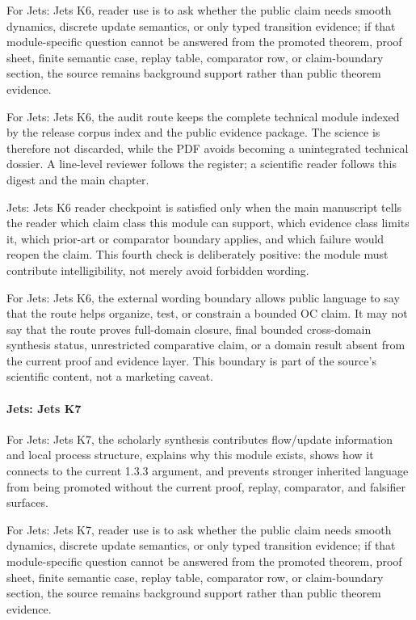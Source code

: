 For Jets: Jets K6, reader use is to ask whether the public claim needs smooth dynamics, discrete update semantics, or only typed transition evidence; if that module-specific question cannot be answered from the promoted theorem, proof sheet, finite semantic case, replay table, comparator row, or claim-boundary section, the source remains background support rather than public theorem evidence.


For Jets: Jets K6, the audit route keeps the complete technical module indexed by the release corpus index and the public evidence package. The science is therefore not discarded, while the PDF avoids becoming a unintegrated technical dossier. A line-level reviewer follows the register; a scientific reader follows this digest and the main chapter.


Jets: Jets K6 reader checkpoint is satisfied only when the main manuscript tells the reader which claim class this module can support, which evidence class limits it, which prior-art or comparator boundary applies, and which failure would reopen the claim. This fourth check is deliberately positive: the module must contribute intelligibility, not merely avoid forbidden wording.


For Jets: Jets K6, the external wording boundary allows public language to say that the route helps organize, test, or constrain a bounded OC claim. It may not say that the route proves full-domain closure, final bounded cross-domain synthesis status, unrestricted comparative claim, or a domain result absent from the current proof and evidence layer. This boundary is part of the source's scientific content, not a marketing caveat.


\paragraph{Jets: Jets K7}

For Jets: Jets K7, the scholarly synthesis contributes flow/update information and local process structure, explains why this module exists, shows how it connects to the current 1.3.3 argument, and prevents stronger inherited language from being promoted without the current proof, replay, comparator, and falsifier surfaces.


For Jets: Jets K7, reader use is to ask whether the public claim needs smooth dynamics, discrete update semantics, or only typed transition evidence; if that module-specific question cannot be answered from the promoted theorem, proof sheet, finite semantic case, replay table, comparator row, or claim-boundary section, the source remains background support rather than public theorem evidence.


